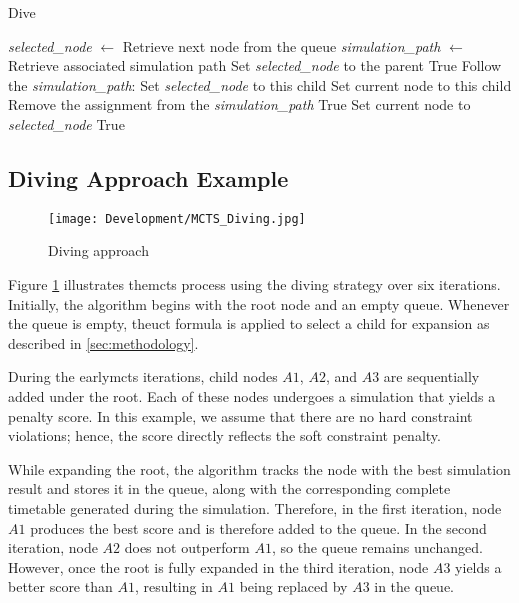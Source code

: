 \begin{algorithm}
\caption{Dive}\label{diving_algorithm}
\begin{algorithmic}[1]
		\State \textit{selected\_node} $\gets$ Retrieve next node from the queue 
		\State \textit{simulation\_path} $\gets$ Retrieve associated simulation path
            		\State Set \textit{selected\_node} to the parent
            		\State \Return True
 			\State Follow the \textit{simulation\_path}:
					\State Set \textit{selected\_node} to this child
					\State Set current node to this child
					\State Remove the assignment from the \textit{simulation\_path}
					\State \Return True
				\EndIf
			\EndFor
		\Else
			\State Set current node to \textit{selected\_node}
               		\State \Return True
            	\EndIf
\EndFunction
\end{algorithmic}
\end{algorithm}

\subsection{Diving Approach Example}


\begin{figure}
      \centering
      \texttt{[image: Development/MCTS\_Diving.jpg]}
      \caption[Diving approach]
      {Diving approach}
      \label{fig:diving}
\end{figure}


Figure \ref{fig:diving} illustrates the\ac{mcts} process using the diving strategy over six iterations. Initially, the algorithm begins with the root node and an empty queue. Whenever the queue is empty, the\ac{uct} formula is applied to select a child for expansion as described in \ref{sec:methodology}.

During the early\ac{mcts} iterations, child nodes \(A1\), \(A2\), and \(A3\) are sequentially added under the root. Each of these nodes undergoes a simulation that yields a penalty score. In this example, we assume that there are no hard constraint violations; hence, the score directly reflects the soft constraint penalty. 

While expanding the root, the algorithm tracks the node with the best simulation result and stores it in the queue, along with the corresponding complete timetable generated during the simulation. Therefore, in the first iteration, node \(A1\) produces the best score and is therefore added to the queue. In the second iteration, node \(A2\) does not outperform \(A1\), so the queue remains unchanged. However, once the root is fully expanded in the third iteration, node \(A3\) yields a better score than \(A1\), resulting in \(A1\) being replaced by \(A3\) in the queue. 

